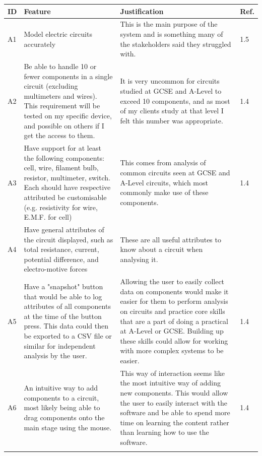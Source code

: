 \documentclass[11pt]{article}
\begin{document}
        \begin{table}[!h]
            \centering
            \footnotesize
            \begin{tabular}{@{}lp{185pt}p{200pt}l@{}} \toprule
                \textbf{ID} & \textbf{Feature} & \textbf{Justification} & \textbf{Ref.} \\ \midrule
                A1 & Model electric circuits accurately & This is the main purpose of the system and is something many of the stakeholders said they struggled with. & 1.5 \\ \medskip
                A2 & Be able to handle 10 or fewer components in a single circuit (excluding multimeters and wires). This requirement will be tested on my specific device, and possible on others if I get the access to them. & It is very uncommon for circuits studied at GCSE and A-Level to exceed 10 components, and as most of my clients study at that level I felt this number was appropriate. & 1.4 \\ \medskip
                A3 & Have support for at least the following components: cell, wire, filament bulb, resistor, multimeter, switch. Each should have respective attributed be customisable (e.g. resistivity for wire, E.M.F. for cell) & This comes from analysis of common circuits seen at GCSE and A-Level circuits, which most commonly make use of these components. & 1.4 \\ \medskip
                A4 & Have general attributes of the circuit displayed, such as total resistance, current, potential difference, and electro-motive forces & These are all useful attributes to know about a circuit when analysing it. &  \\ \medskip
                A5 & Have a "snapshot" button that would be able to log attributes of all components at the time of the button press. This data could then be exported to a CSV file or similar for independent analysis by the user. & Allowing the user to easily collect data on components would make it easier for them to perform analysis on circuits and practice core skills that are a part of doing a practical at A-Level or GCSE. Building up these skills could allow for working with more complex systems to be easier. & 1.4 \\ \medskip
                A6 & An intuitive way to add components to a circuit, most likely being able to drag components onto the main stage using the mouse. & This way of interaction seems like the most intuitive way of adding new components. This would allow the user to easily interact with the software and be able to spend more time on learning the content rather than learning how to use the software. & 1.4 \\ \medskip

\end{tabular}
\end{table}
\end{document}
